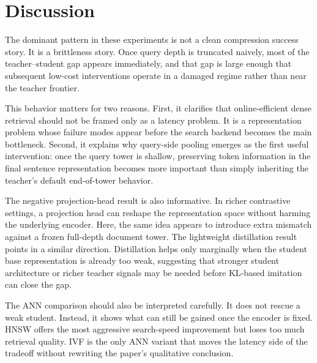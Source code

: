 \section{Discussion}

The dominant pattern in these experiments is not a clean compression success story. It is a brittleness story. Once query depth is truncated naively, most of the teacher--student gap appears immediately, and that gap is large enough that subsequent low-cost interventions operate in a damaged regime rather than near the teacher frontier.

This behavior matters for two reasons. First, it clarifies that online-efficient dense retrieval should not be framed only as a latency problem. It is a representation problem whose failure modes appear before the search backend becomes the main bottleneck. Second, it explains why query-side pooling emerges as the first useful intervention: once the query tower is shallow, preserving token information in the final sentence representation becomes more important than simply inheriting the teacher's default end-of-tower behavior.

The negative projection-head result is also informative. In richer contrastive settings, a projection head can reshape the representation space without harming the underlying encoder. Here, the same idea appears to introduce extra mismatch against a frozen full-depth document tower. The lightweight distillation result points in a similar direction. Distillation helps only marginally when the student base representation is already too weak, suggesting that stronger student architecture or richer teacher signals may be needed before KL-based imitation can close the gap.

The ANN comparison should also be interpreted carefully. It does not rescue a weak student. Instead, it shows what can still be gained once the encoder is fixed. HNSW offers the most aggressive search-speed improvement but loses too much retrieval quality. IVF is the only ANN variant that moves the latency side of the tradeoff without rewriting the paper's qualitative conclusion.
